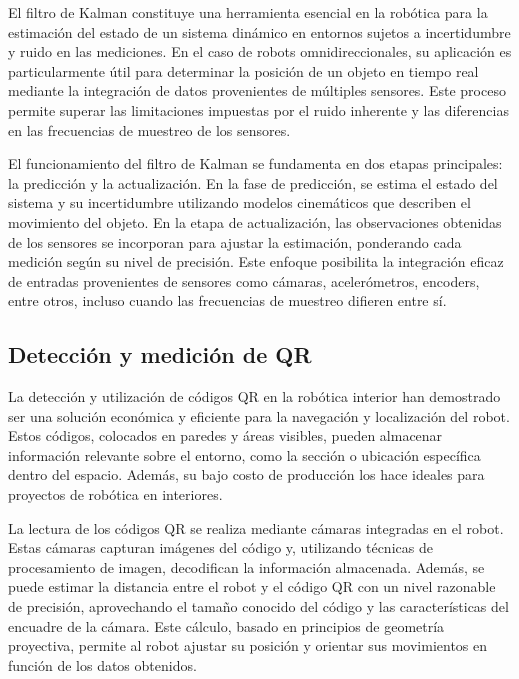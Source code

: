 El filtro de Kalman constituye una herramienta esencial en la robótica para la estimación del estado de un sistema dinámico en entornos sujetos a incertidumbre y ruido en las mediciones. En el caso de robots omnidireccionales, su aplicación es particularmente útil para determinar la posición de un objeto en tiempo real mediante la integración de datos provenientes de múltiples sensores. Este proceso permite superar las limitaciones impuestas por el ruido inherente y las diferencias en las frecuencias de muestreo de los sensores. \cite{tzafestas2013introduction}

El funcionamiento del filtro de Kalman se fundamenta en dos etapas principales: la predicción y la actualización. En la fase de predicción, se estima el estado del sistema y su incertidumbre utilizando modelos cinemáticos que describen el movimiento del objeto. En la etapa de actualización, las observaciones obtenidas de los sensores se incorporan para ajustar la estimación, ponderando cada medición según su nivel de precisión. Este enfoque posibilita la integración eficaz de entradas provenientes de sensores como cámaras, acelerómetros, encoders, entre otros, incluso cuando las frecuencias de muestreo difieren entre sí. \cite{nuaimisurveyindoorpositioning}


\subsection{Detección y medición de QR}

La detección y utilización de códigos QR en la robótica interior han demostrado ser una solución económica y eficiente para la navegación y localización del robot. Estos códigos, colocados en paredes y áreas visibles, pueden almacenar información relevante sobre el entorno, como la sección o ubicación específica dentro del espacio. Además, su bajo costo de producción los hace ideales para proyectos de robótica en interiores. \cite{tzafestas2013introduction}

La lectura de los códigos QR se realiza mediante cámaras integradas en el robot. Estas cámaras capturan imágenes del código y, utilizando técnicas de procesamiento de imagen, decodifican la información almacenada. Además, se puede estimar la distancia entre el robot y el código QR con un nivel razonable de precisión, aprovechando el tamaño conocido del código y las características del encuadre de la cámara. Este cálculo, basado en principios de geometría proyectiva, permite al robot ajustar su posición y orientar sus movimientos en función de los datos obtenidos. \cite{kendalmeasurecamera}
